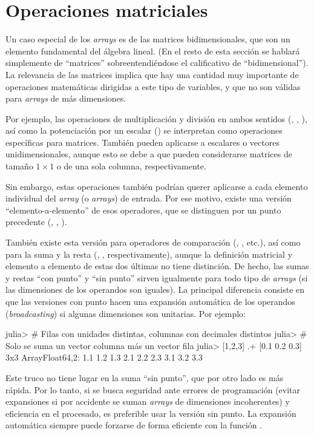 \section{Operaciones matriciales}

Un caso especial de los \emph{arrays} es de las matrices bidimensionales, que son un elemento fundamental del álgebra lineal. (En el resto de esta sección se hablará simplemente de ``matrices'' sobreentendiéndose el calificativo de ``bidimensional''). La relevancia de las matrices implica que hay una cantidad muy importante de operaciones matemáticas dirigidas a este tipo de variables, y que no son válidas para \emph{arrays} de más dimensiones.

Por ejemplo, las operaciones de multiplicación y división en ambos sentidos (\jl{*}, \jl{/}, \jl{\\} ), así como la potenciación por un escalar (\jl{^}) se interpretan como operaciones específicas para matrices. También pueden aplicarse a escalares o vectores unidimensionales, aunque esto se debe a que pueden considerarse matrices de tamaño $1\times{}1$ o de una sola columna, respectivamente.

Sin embargo, estas operaciones también podrían querer aplicarse a cada elemento individual del \emph{array} (o \emph{arrays}) de entrada. Por ese motivo, existe una versión ``elemento-a-elemento'' de esos operadores, que se distinguen por un punto precedente (, , ).

También existe esta versión para operadores de comparación (, , etc.), así como para  la suma y la resta (, , respectivamente), aunque la definición matricial y elemento a elemento de estas dos últimas no tiene distinción. De hecho, las sumas y restas ``con punto'' y ``sin punto'' sirven igualmente para todo tipo de \emph{arrays} (si las dimensiones de los operandos son iguales). La principal diferencia consiste en que las versiones con punto hacen una expansión automática de los operandos (\emph{broadcasting}) si algunas dimensiones son unitarias. Por ejemplo:

\begin{jlconcode}
julia> # Filas con unidades distintas, columnas con decimales distintos
julia> # Solo se suma un vector columna más un vector fila
julia> [1,2,3] .+ [0.1 0.2 0.3]
3x3 Array{Float64,2}:
 1.1 1.2 1.3
 2.1 2.2 2.3
 3.1 3.2 3.3
\end{jlconcode}

Este truco no tiene lugar en la suma ``sin punto'', que por otro lado es más rápida. Por lo tanto, si se busca seguridad ante errores de programación (evitar expansiones si por accidente se suman \emph{arrays} de dimensiones incoherentes) y eficiencia en el procesado, es preferible usar la versión sin punto. La expansión automática siempre puede forzarse de forma eficiente con la función .

